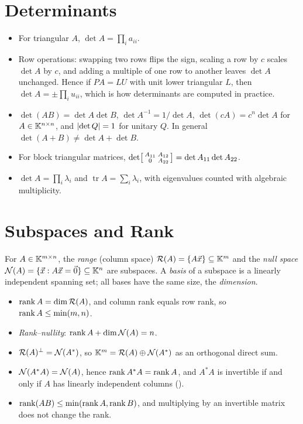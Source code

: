 \section{Determinants}
\label{sec:det}

\begin{itemize}
  \item For triangular $A$, $\det A = \prod_i a_{ii}$.
  \item Row operations: swapping two rows flips the sign, scaling a row by $c$ scales $\det A$ by $c$, and adding a multiple of one row to another leaves $\det A$ unchanged. Hence if $PA = LU$ with unit lower triangular $L$, then $\det A = \pm\prod_i u_{ii}$, which is how determinants are computed in practice.
  \item $\det(AB) = \det A\det B$, $\det A^{-1} = 1/\det A$, $\det(cA) = c^n\det A$ for $A \in \mathbb{K}^{n \times n}$, and $\left\lvert \det Q \right\rvert = 1$ for unitary $Q$. In general $\det(A + B) \ne \det A + \det B$.
  \item For block triangular matrices, $\det\begin{bsmallmatrix} A_{11} & A_{12} \\ 0 & A_{22} \end{bsmallmatrix} = \det A_{11}\det A_{22}$.
  \item $\det A = \prod_i \lambda_i$ and $\operatorname{tr} A = \sum_i \lambda_i$, with eigenvalues counted with algebraic multiplicity.
\end{itemize}

\section{Subspaces and Rank}
\label{sec:subspaces}

For $A \in \mathbb{K}^{m \times n}$, the \emph{range} (column space) $\mathcal{R}(A) = \{A\vec{x}\} \subseteq \mathbb{K}^m$ and the \emph{null space} $\mathcal{N}(A) = \{\vec{x} : A\vec{x} = \vec{0}\} \subseteq \mathbb{K}^n$ are subspaces. A \emph{basis} of a subspace is a linearly independent spanning set; all bases have the same size, the \emph{dimension}.
\begin{itemize}
  \item $\operatorname{rank} A = \dim\mathcal{R}(A)$, and column rank equals row rank, so $\operatorname{rank} A \le \min(m, n)$.
  \item \emph{Rank--nullity}: $\operatorname{rank} A + \dim\mathcal{N}(A) = n$.
  \item $\mathcal{R}(A)^\perp = \mathcal{N}(A^\ast)$, so $\mathbb{K}^m = \mathcal{R}(A) \oplus \mathcal{N}(A^\ast)$ as an orthogonal direct sum.
  \item $\mathcal{N}(A^\ast A) = \mathcal{N}(A)$, hence $\operatorname{rank} A^\ast A = \operatorname{rank} A$, and $A^\ast A$ is invertible if and only if $A$ has linearly independent columns ().
  \item $\operatorname{rank}(AB) \le \min(\operatorname{rank} A, \operatorname{rank} B)$, and multiplying by an invertible matrix does not change the rank.
\end{itemize}


